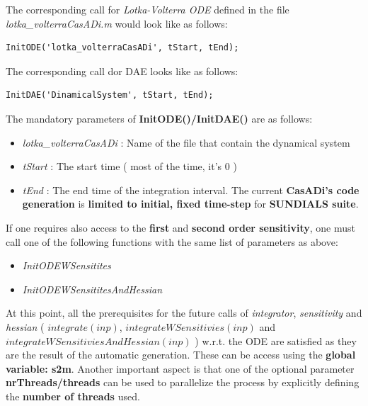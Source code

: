 \documentclass[12pt, letterpaper]{article}
\begin{document}
The corresponding call for \textit{Lotka-Volterra ODE} defined in the file \\ \textit{lotka\_volterraCasADi.m} would look like as follows:

\begin{lstlisting}
InitODE('lotka_volterraCasADi', tStart, tEnd);
\end{lstlisting}

The corresponding call dor DAE looks like as follows:
\begin{lstlisting}
InitDAE('DinamicalSystem', tStart, tEnd);
\end{lstlisting}

The mandatory parameters of \textbf{InitODE()/InitDAE()} are as follows: 

\begin{itemize}
	\item \textit{lotka\_volterraCasADi} : Name of the file that contain the dynamical system
	\item \textit{tStart} : The start time ( most of the time, it's $0$ )
	\item \textit{tEnd} : The end time of the integration interval. The current \textbf{ CasADi's code generation} is \textbf{limited to initial, fixed time-step} for \textbf{SUNDIALS suite}.
\end{itemize}

If one requires also access to the \textbf{ first} and \textbf{second order sensitivity}, one must call one of the following functions with the same list of parameters as above:
\begin{itemize}
	\item \textit{InitODEWSensitites}
	\item \textit{InitODEWSensititesAndHessian}
\end{itemize}



At this point, all the prerequisites for the future calls of \textit{integrator}, \textit{sensitivity} and \textit{hessian} ( $integrate(inp)$, $integrateWSensitivies(inp)$ and \\ $integrateWSensitiviesAndHessian(inp)$ ) w.r.t. the ODE are satisfied as they are the result of the automatic generation. These can be access using the \textbf{global variable: s2m}. Another important aspect is that one of the optional parameter \textbf{nrThreads/threads} can be used to parallelize the process by explicitly defining the \textbf{ number of threads} used. \\ 
\end{document}
